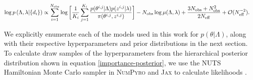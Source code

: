 \begin{equation}\label{importance-posterior}
    \log p\left(\Lambda, \lambda | \{d_i\}\right) \propto \sum_{i=1}^{N_\mathrm{obs}} \log \bigg[ \frac{1}{K_i} \sum_{j=1}^{K_i} \frac{p(\theta^{i,j}|\Lambda)p(z^{i,j}|\lambda)}{\pi(\theta^{i,j}, z^{i,j})} \bigg] -  \\
    N_\mathrm{obs} \log \mu(\Lambda, \lambda) + \frac{3N_\mathrm{obs} + N_\mathrm{obs}^2}{2N_\mathrm{eff}} + \mathcal{O}(N_\mathrm{eff}^{-2}).
\end{equation}

We explicitly enumerate each of the models used in this work for $p(\theta|\Lambda)$, along with 
their respective hyperparameters and prior distributions in the next section. To calculate draw 
samples of the hyperparameters from the hierarchical posterior distribution shown in equation \ref{importance-posterior}, we use the 
NUTS Hamiltonian Monte Carlo sampler in \textsc{NumPyro} and \textsc{Jax} to calculate likelihoods \citep{jax,pyro,numpyro}.

